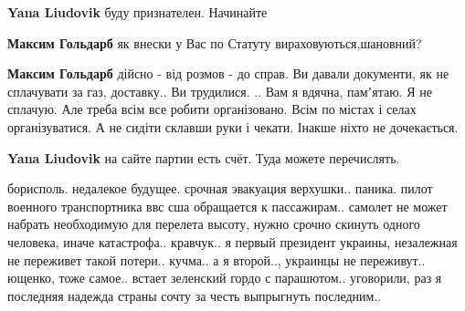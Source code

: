 \begin{itemize}
\begin{itemize}
\textbf{Yana Liudovik} буду признателен. Начинайте

 
\textbf{Максим Гольдарб} як внески у Вас по Статуту вираховуються,шановний?

 
\textbf{Максим Гольдарб} дійсно - від розмов - до справ.
Ви давали документи, як не сплачувати за газ, доставку.. Ви трудилися. .. Вам я вдячна, памʼятаю.
Я не сплачую. Але треба всім все робити організовано.
Всім по містах і селах організуватися. А не сидіти склавши руки і чекати. Інакше ніхто не дочекається.

 
\textbf{Yana Liudovik} на сайте партии есть счёт. Туда можете перечислять.
\end{itemize}

 

\obeycr
борисполь. недалекое будущее. срочная эвакуация верхушки.. паника.
пилот военного транспортника ввс сша обращается к пассажирам.. самолет не может набрать необходимую для перелета высоту, нужно срочно скинуть одного человека, иначе катастрофа..
кравчук.. я первый президент украины, незалежная
не переживет такой потери..
кучма.. а я второй.., украинцы не переживут..
ющенко, тоже самое..
встает зеленский гордо с парашютом.. уговорили, раз я последняя надежда страны сочту за честь выпрыгнуть последним..
\restorecr

\begin{itemize}
 

\end{itemize}
\end{itemize}
